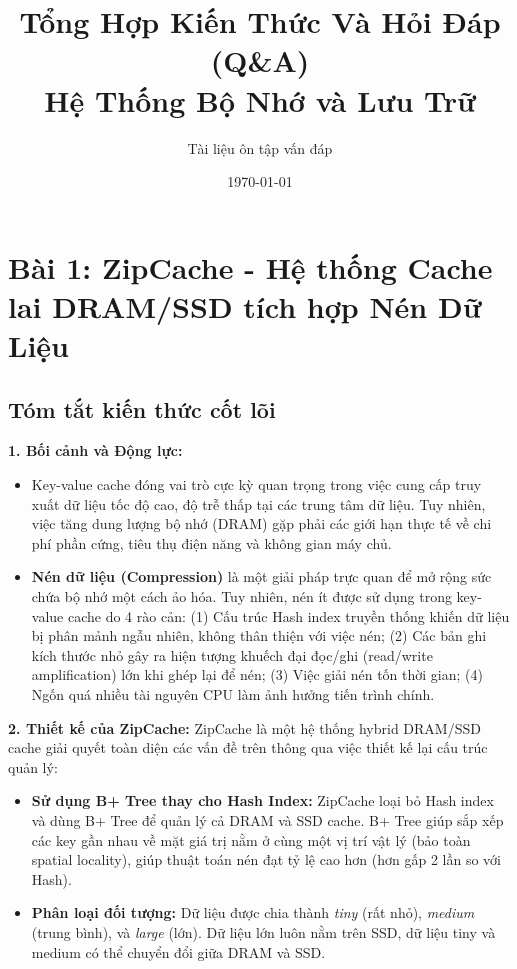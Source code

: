 \documentclass[12pt,a4paper]{article}
\title{Tổng Hợp Kiến Thức Và Hỏi Đáp (Q\&A)\\ Hệ Thống Bộ Nhớ và Lưu Trữ}
\author{Tài liệu ôn tập vấn đáp}
\date{\today}
\begin{document}
\maketitle
\tableofcontents
\newpage

\section{Bài 1: ZipCache - Hệ thống Cache lai DRAM/SSD tích hợp Nén Dữ Liệu}

\subsection{Tóm tắt kiến thức cốt lõi}

\textbf{1. Bối cảnh và Động lực:}
\begin{itemize}
    \item Key-value cache đóng vai trò cực kỳ quan trọng trong việc cung cấp truy xuất dữ liệu tốc độ cao, độ trễ thấp tại các trung tâm dữ liệu. Tuy nhiên, việc tăng dung lượng bộ nhớ (DRAM) gặp phải các giới hạn thực tế về chi phí phần cứng, tiêu thụ điện năng và không gian máy chủ.
    \item \textbf{Nén dữ liệu (Compression)} là một giải pháp trực quan để mở rộng sức chứa bộ nhớ một cách ảo hóa. Tuy nhiên, nén ít được sử dụng trong key-value cache do 4 rào cản: (1) Cấu trúc Hash index truyền thống khiến dữ liệu bị phân mảnh ngẫu nhiên, không thân thiện với việc nén; (2) Các bản ghi kích thước nhỏ gây ra hiện tượng khuếch đại đọc/ghi (read/write amplification) lớn khi ghép lại để nén; (3) Việc giải nén tốn thời gian; (4) Ngốn quá nhiều tài nguyên CPU làm ảnh hưởng tiến trình chính.
\end{itemize}

\textbf{2. Thiết kế của ZipCache:}
ZipCache là một hệ thống hybrid DRAM/SSD cache giải quyết toàn diện các vấn đề trên thông qua việc thiết kế lại cấu trúc quản lý:
\begin{itemize}
    \item \textbf{Sử dụng B+ Tree thay cho Hash Index:} ZipCache loại bỏ Hash index và dùng B+ Tree để quản lý cả DRAM và SSD cache. B+ Tree giúp sắp xếp các key gần nhau về mặt giá trị nằm ở cùng một vị trí vật lý (bảo toàn spatial locality), giúp thuật toán nén đạt tỷ lệ cao hơn (hơn gấp 2 lần so với Hash).
    \item \textbf{Phân loại đối tượng:} Dữ liệu được chia thành \textit{tiny} (rất nhỏ), \textit{medium} (trung bình), và \textit{large} (lớn). Dữ liệu lớn luôn nằm trên SSD, dữ liệu tiny và medium có thể chuyển đổi giữa DRAM và SSD.
\end{itemize}
\end{document}
